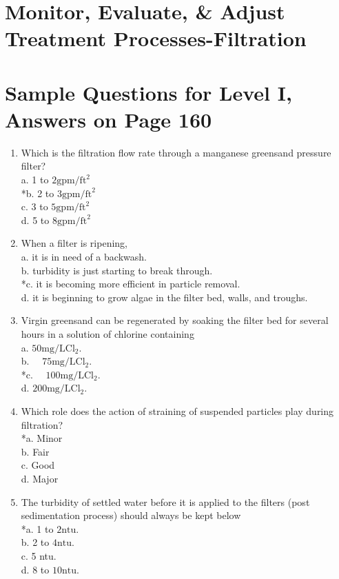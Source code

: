 \section{Monitor, Evaluate, \& Adjust Treatment Processes-Filtration}
\section{Sample Questions for Level I, Answers on Page 160}
\begin{enumerate}[label=TI\arabic*]
\item Which is the filtration flow rate through a manganese greensand pressure filter?\\
a. 1 to $2 \mathrm{gpm} / \mathrm{ft}^{2}$\\
*b. 2 to $3 \mathrm{gpm} / \mathrm{ft}^{2}$\\
c. 3 to $5 \mathrm{gpm} / \mathrm{ft}^{2}$\\
d. 5 to $8 \mathrm{gpm} / \mathrm{ft}^{2}$\\
\item When a filter is ripening,\\
a. it is in need of a backwash.\\
b. turbidity is just starting to break through.\\
*c. it is becoming more efficient in particle removal.\\
d. it is beginning to grow algae in the filter bed, walls, and troughs.\\
\item Virgin greensand can be regenerated by soaking the filter bed for several hours in a solution of chlorine containing\\
a. $50 \mathrm{mg} / \mathrm{L} \mathrm{Cl}_{2}$.\\
b. $\quad 75 \mathrm{mg} / \mathrm{L} \mathrm{Cl}_{2}$.\\
*c. $\quad 100 \mathrm{mg} / \mathrm{L} \mathrm{Cl}_{2}$.\\
d. $200 \mathrm{mg} / \mathrm{L} \mathrm{Cl}_{2}$.\\
\item Which role does the action of straining of suspended particles play during filtration?\\
*a. Minor\\
b. Fair\\
c. Good\\
d. Major\\
\item The turbidity of settled water before it is applied to the filters (post sedimentation process) should always be kept below\\
*a. 1 to $2 \mathrm{ntu}$.\\
b. 2 to $4 \mathrm{ntu}$.\\
c. 5 ntu.\\
d. 8 to $10 \mathrm{ntu}$.\\
\end{enumerate}
